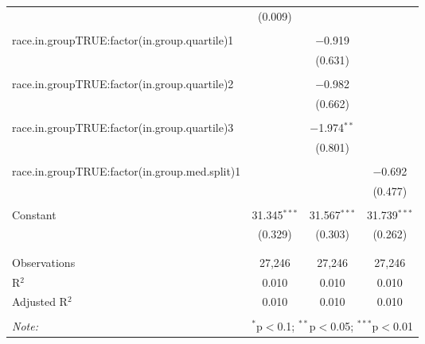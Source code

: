\begin{table}[!htbp]
\begin{tabular}{@{\extracolsep{5pt}}lccc}
  & (0.009) &  &  \\ 
  & & & \\ 
 race.in.groupTRUE:factor(in.group.quartile)1 &  & $-$0.919 &  \\ 
  &  & (0.631) &  \\ 
  & & & \\ 
 race.in.groupTRUE:factor(in.group.quartile)2 &  & $-$0.982 &  \\ 
  &  & (0.662) &  \\ 
  & & & \\ 
 race.in.groupTRUE:factor(in.group.quartile)3 &  & $-$1.974$^{**}$ &  \\ 
  &  & (0.801) &  \\ 
  & & & \\ 
 race.in.groupTRUE:factor(in.group.med.split)1 &  &  & $-$0.692 \\ 
  &  &  & (0.477) \\ 
  & & & \\ 
 Constant & 31.345$^{***}$ & 31.567$^{***}$ & 31.739$^{***}$ \\ 
  & (0.329) & (0.303) & (0.262) \\ 
  & & & \\ 
\hline \\[-1.8ex] 
Observations & 27,246 & 27,246 & 27,246 \\ 
R$^{2}$ & 0.010 & 0.010 & 0.010 \\ 
Adjusted R$^{2}$ & 0.010 & 0.010 & 0.010 \\ 
\hline 
\hline \\[-1.8ex] 
\textit{Note:}  & \multicolumn{3}{r}{$^{*}$p$<$0.1; $^{**}$p$<$0.05; $^{***}$p$<$0.01} \\ 
\end{tabular} 
\end{table} 
